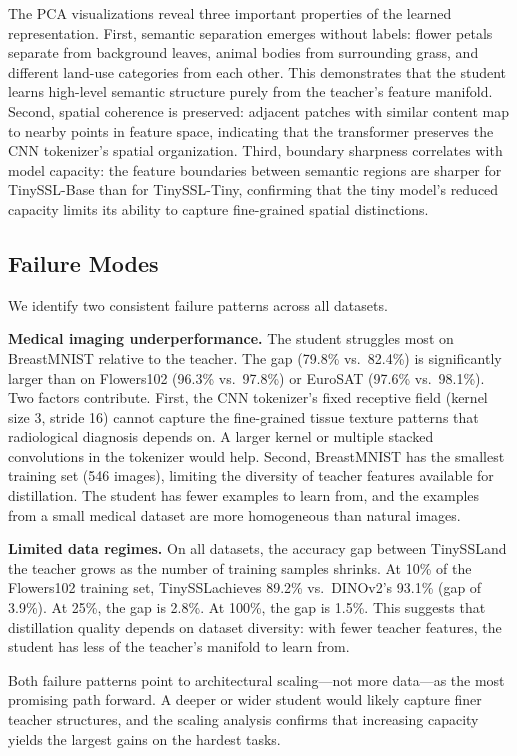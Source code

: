 \documentclass{article}
\newcommand{\method}{TinySSL}
\begin{document}
The PCA visualizations reveal three important properties of the learned representation. First, semantic separation emerges without labels: flower petals separate from background leaves, animal bodies from surrounding grass, and different land-use categories from each other. This demonstrates that the student learns high-level semantic structure purely from the teacher's feature manifold. Second, spatial coherence is preserved: adjacent patches with similar content map to nearby points in feature space, indicating that the transformer preserves the CNN tokenizer's spatial organization. Third, boundary sharpness correlates with model capacity: the feature boundaries between semantic regions are sharper for \method-Base than for \method-Tiny, confirming that the tiny model's reduced capacity limits its ability to capture fine-grained spatial distinctions.

\subsection{Failure Modes}

We identify two consistent failure patterns across all datasets.

\textbf{Medical imaging underperformance.} The student struggles most on BreastMNIST relative to the teacher. The gap (79.8\% vs.\ 82.4\%) is significantly larger than on Flowers102 (96.3\% vs.\ 97.8\%) or EuroSAT (97.6\% vs.\ 98.1\%). Two factors contribute. First, the CNN tokenizer's fixed receptive field (kernel size 3, stride 16) cannot capture the fine-grained tissue texture patterns that radiological diagnosis depends on. A larger kernel or multiple stacked convolutions in the tokenizer would help. Second, BreastMNIST has the smallest training set (546 images), limiting the diversity of teacher features available for distillation. The student has fewer examples to learn from, and the examples from a small medical dataset are more homogeneous than natural images.

\textbf{Limited data regimes.} On all datasets, the accuracy gap between \method and the teacher grows as the number of training samples shrinks. At 10\% of the Flowers102 training set, \method achieves 89.2\% vs.\ DINOv2's 93.1\% (gap of 3.9\%). At 25\%, the gap is 2.8\%. At 100\%, the gap is 1.5\%. This suggests that distillation quality depends on dataset diversity: with fewer teacher features, the student has less of the teacher's manifold to learn from.

Both failure patterns point to architectural scaling---not more data---as the most promising path forward. A deeper or wider student would likely capture finer teacher structures, and the scaling analysis confirms that increasing capacity yields the largest gains on the hardest tasks.
\end{document}
